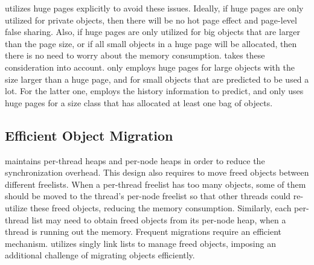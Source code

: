 \NA{} utilizes huge pages explicitly to avoid these issues. Ideally, if huge pages are only utilized for private objects, then there will be no hot page effect and page-level false sharing. Also, if huge pages are only utilized for big objects that are larger than the page size, or if all small objects in a huge page will be allocated, then there is no need to worry about the memory consumption. \NA{} takes these consideration into account. \NM{} only employs huge pages for large objects with the size larger than a huge page, and for small objects that are predicted to be used a lot. For the latter one, \NM{} employs the history information to predict, and only uses huge pages for a size class that has allocated at least one bag of objects. 


\subsection{Efficient Object Migration} 

\label{sec:moveobjects}

\NM{} maintains per-thread heaps and per-node heaps in order to reduce the synchronization overhead. This design also requires to move freed objects between different freelists. 
When a per-thread freelist has too many objects, some of them should be moved to the thread's per-node freelist so that other threads could re-utilize these freed objects, reducing the memory consumption. Similarly, each per-thread list may need to obtain freed objects from its per-node heap, when a thread is running out the memory. Frequent migrations require an efficient mechanism. \NM{} utilizes singly link lists to manage freed objects, imposing an additional challenge of migrating objects efficiently. 


